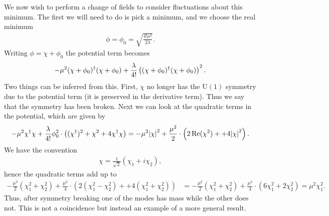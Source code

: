 We now wish to perform a change of fields to consider fluctuations about this minimum. The first we will need to do is pick a minimum, and we choose the real minimum
\begin{align*}
	\phi = \phi_{0} = \sqrt{\frac{4!\mu^{2}}{2\lambda}}.
\end{align*}
Writing $\phi = \chi + \phi_{0}$ the potential term becomes
\begin{align*}
	-\mu^{2}(\chi + \phi_{0})^{\dagger}(\chi + \phi_{0}) + \frac{\lambda}{4!}\left((\chi + \phi_{0})^{\dagger}(\chi + \phi_{0})\right)^{2}.
\end{align*}
Two things can be inferred from this. First, $\chi$ no longer has the $\text{U}(1)$ symmetry due to the potential term (it is preserved in the derivative term). Thus we say that the symmetry has been broken. Next we can look at the quadratic terms in the potential, which are given by
\begin{align*}
	-\mu^{2}\chi^{\dagger}\chi + \frac{\lambda}{4!}\phi_{0}^{2}\cdot \left((\chi^{\dagger})^{2} + \chi^{2} + 4\chi^{\dagger}\chi\right) = -\mu^{2}\abs{\chi}^{2} + \frac{\mu^{2}}{2}\cdot \left(2\Re(\chi^{2}) +  + 4\abs{\chi}^{2}\right).
\end{align*}
We have the convention
\begin{align*}
	\chi = \frac{1}{\sqrt{2}}(\chi_{1} + i\chi_{2}),
\end{align*}
hence the quadratic terms add up to
\begin{align*}
	-\frac{\mu^{2}}{2}(\chi_{1}^{2} + \chi_{2}^{2}) + \frac{\mu^{2}}{4}\cdot \left(2(\chi_{1}^{2} - \chi_{2}^{2}) +  + 4(\chi_{1}^{2} + \chi_{2}^{2})\right) &= -\frac{\mu^{2}}{2}(\chi_{1}^{2} + \chi_{2}^{2}) + \frac{\mu^{2}}{4}\cdot \left(6\chi_{1}^{2} + 2\chi_{2}^{2}\right) = \mu^{2}\chi_{1}^{2}.
\end{align*}
Thus, after symmetry breaking one of the modes has mass while the other does not. This is not a coincidence but instead an example of a more general result.


